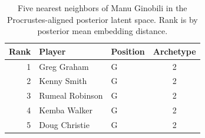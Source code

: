 \begin{table}[htbp]
  \centering\small
  \begin{tabular}{rllc}
    \toprule
    Rank & Player & Position & Archetype \\
    \midrule
    1 & Greg Graham & G & 2 \\
    2 & Kenny Smith & G & 2 \\
    3 & Rumeal Robinson & G & 2 \\
    4 & Kemba Walker & G & 2 \\
    5 & Doug Christie & G & 2 \\
    \bottomrule
  \end{tabular}
  \caption{Five nearest neighbors of Manu Ginobili in the Procrustes-aligned posterior latent space. Rank is by posterior mean embedding distance.}
  \label{tab:Manu_Ginobili_neighbors}
\end{table}


